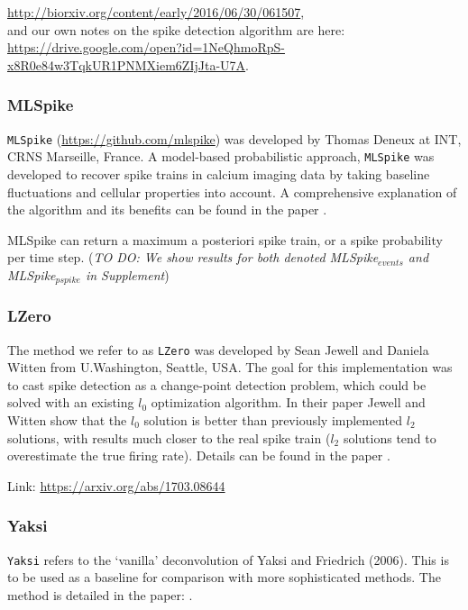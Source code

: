 \documentclass[a4paper,10pt,twocolumn]{article}
\begin{document}
\noindent \href{http://biorxiv.org/content/early/2016/06/30/061507}{http://biorxiv.org/content/early/2016/06/30/061507}, \\

\noindent and our own notes on the spike detection algorithm are here:\\

\noindent \href{https://drive.google.com/open?id=1NeQhmoRpS-x8R0e84w3TqkUR1PNMXiem6ZIjJta-U7A}{https://drive.google.com/open?id=1NeQhmoRpS-x8R0e84w3TqkUR1PNMXiem6ZIjJta-U7A}.

\subsubsection*{MLSpike}
\texttt{MLSpike} (\href{https://github.com/mlspike}{https://github.com/mlspike}) was developed by Thomas Deneux at INT, CRNS Marseille, France. A model-based probabilistic approach, \texttt{MLSpike} was developed to recover spike trains in calcium imaging data by taking baseline fluctuations and cellular properties into account. A comprehensive explanation of the algorithm and its benefits can be found in the paper \citep{Deneux2016-gu}.

MLSpike can return a maximum a posteriori spike train, or a spike probability per time step. (\emph{TO DO: We show results for both denoted MLSpike$_{events}$ and MLSpike$_{pspike}$ in Supplement})

\subsubsection*{LZero}
The method we refer to as \texttt{LZero} was developed by Sean Jewell and Daniela Witten from U.Washington, Seattle, USA. The goal for this implementation was to cast spike detection as a change-point detection problem, which could be solved with an existing $l_{0}$ optimization algorithm. In their paper Jewell and Witten show that the $l_{0}$ solution is better than previously implemented $l_{2}$ solutions, with results much closer to the real spike train ($l_{2}$ solutions tend to overestimate the true firing rate). Details can be found in the paper \citep{Jewell2017-pr}.

\noindent Link: \href{https://arxiv.org/abs/1703.08644}{https://arxiv.org/abs/1703.08644}

\subsubsection*{Yaksi}
\texttt{Yaksi} refers to the `vanilla' deconvolution of Yaksi and Friedrich (2006). This is to be used as a baseline for comparison with more sophisticated methods. The method is detailed in the paper: \citep{Yaksi2006-ic}. 
\end{document}

